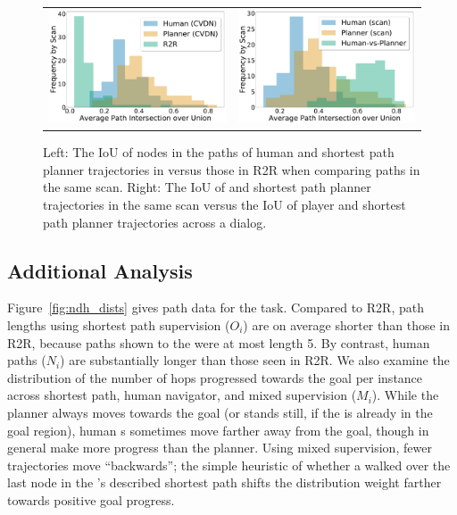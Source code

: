 \begin{figure}[ht]
\begin{tabular}{cc}
    \includegraphics[width=0.45\columnwidth]{figures/iou_mp_comparison.pdf} &
    \includegraphics[width=0.45\columnwidth]{figures/iou_human_perf.pdf}
\end{tabular}
\caption{Left: The IoU of nodes in the paths of human \nav{} and shortest path planner trajectories in \dataset{} versus those in R2R when comparing paths in the same scan.
Right: The IoU of \nav{} and shortest path planner trajectories in the same scan versus the IoU of player and shortest path planner trajectories across a dialog.}
\label{fig:iou_comp}
\end{figure}

\subsection{Additional \task{} Analysis}

Figure~\ref{fig:ndh_dists} gives path data for the \task{} task.
Compared to R2R, path lengths using shortest path supervision ($O_i$) are on average shorter than those in R2R, because paths shown to the \ora{} were at most length 5.
By contrast, human \nav{} paths ($N_i$) are substantially longer than those seen in R2R.
We also examine the distribution of the number of hops progressed towards the goal per \task{} instance across \ora{} shortest path, human navigator, and mixed supervision ($M_i$).
While the planner always moves towards the goal (or stands still, if the \nav{} is already in the goal region), human \nav{}s sometimes move farther away from the goal, though in general make more progress than the planner.
Using mixed supervision, fewer trajectories move ``backwards''; the simple heuristic of whether a \nav{} walked over the last node in the \ora{}'s described shortest path shifts the distribution weight farther towards positive goal progress.

